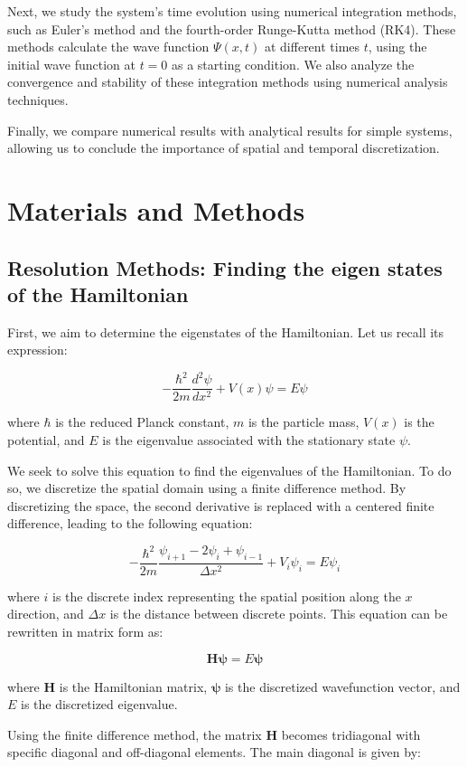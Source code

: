 \documentclass[12pt,french]{article}
\begin{document}
Next, we study the system's time evolution using numerical integration methods, such as Euler's method and the fourth-order Runge-Kutta method (RK4). These methods calculate the wave function \( \Psi(x,t) \) at different times \( t \), using the initial wave function at \( t=0 \) as a starting condition. We also analyze the convergence and stability of these integration methods using numerical analysis techniques.

Finally, we compare numerical results with analytical results for simple systems, allowing us to conclude the importance of spatial and temporal discretization.

\section{Materials and Methods}

\subsection{Resolution Methods: Finding the eigen states of the Hamiltonian}

First, we aim to determine the eigenstates of the Hamiltonian. Let us recall its expression:

$$-\frac{\hbar^2}{2m}\frac{d^2\psi}{dx^2} + V(x)\psi = E\psi$$

where $\hbar$ is the reduced Planck constant, $m$ is the particle mass, $V(x)$ is the potential, and $E$ is the eigenvalue associated with the stationary state $\psi$.

We seek to solve this equation to find the eigenvalues of the Hamiltonian. To do so, we discretize the spatial domain using a finite difference method. By discretizing the space, the second derivative is replaced with a centered finite difference, leading to the following equation:

$$-\frac{\hbar^2}{2m}\frac{\psi_{i+1}-2\psi_i+\psi_{i-1}}{\Delta x^2} + V_i\psi_i = E\psi_i$$

where $i$ is the discrete index representing the spatial position along the $x$ direction, and $\Delta x$ is the distance between discrete points. This equation can be rewritten in matrix form as:

$$\mathbf{H}\mathbf{\psi} = E\mathbf{\psi}$$

where $\mathbf{H}$ is the Hamiltonian matrix, $\mathbf{\psi}$ is the discretized wavefunction vector, and $E$ is the discretized eigenvalue.

Using the finite difference method, the matrix $\mathbf{H}$ becomes tridiagonal with specific diagonal and off-diagonal elements. The main diagonal is given by:
\end{document}
